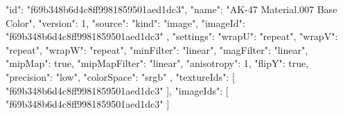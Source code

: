 {
  "id": "f69b348b6d4c8ff9981859501aed1dc3",
  "name": "AK-47 Material.007 Base Color",
  "version": 1,
  "source": {
    "kind": "image",
    "imageId": "f69b348b6d4c8ff9981859501aed1dc3"
  },
  "settings": {
    "wrapU": "repeat",
    "wrapV": "repeat",
    "wrapW": "repeat",
    "minFilter": "linear",
    "magFilter": "linear",
    "mipMap": true,
    "mipMapFilter": "linear",
    "anisotropy": 1,
    "flipY": true,
    "precision": "low",
    "colorSpace": "srgb"
  },
  "textureIds": [
    "f69b348b6d4c8ff9981859501aed1dc3"
  ],
  "imageIds": [
    "f69b348b6d4c8ff9981859501aed1dc3"
  ]
}
